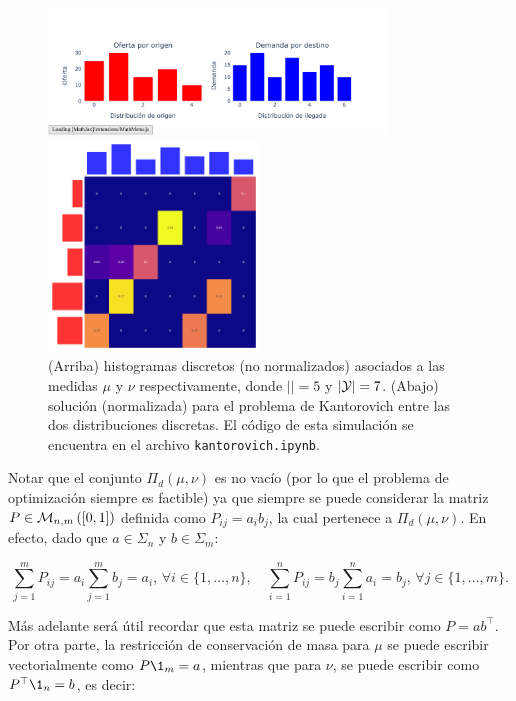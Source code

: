 \begin{figure}
	\centering
	\includegraphics[width=0.8\textwidth]{images/ot/kantorovich_discrete_histogram}

	\includegraphics[width=0.5\textwidth]{images/ot/kantorovich_discrete_solution}
	\caption{(Arriba) histogramas discretos (no normalizados) asociados a las medidas $\mu$ y $\nu$ respectivamente, donde $|\xspace|=5$ y $|\mathcal{Y}|=7$. (Abajo) solución (normalizada) para el problema de Kantorovich entre las dos distribuciones discretas. El código de esta simulación se encuentra en el archivo \texttt{kantorovich.ipynb}.}
	\label{fig:ot/kantorovich_discrete_example}
\end{figure}

Notar que el conjunto $\Pi_d(\mu,\nu)$ es no vacío (por lo que el problema de optimización siempre es factible) ya que siempre se puede considerar la matriz $P\in\mathcal{M}_{n,m}\left([0,1]\right)$ definida como $P_{ij}=a_ib_j$, la cual pertenece a $\Pi_d(\mu,\nu)$. En efecto, dado que $a\in\Sigma_n$ y $b\in\Sigma_m$:

\begin{equation*}
	\sum_{j=1}^m P_{ij} = a_i\sum_{j=1}^m b_j = a_i,\, \forall i\in\{1,\ldots,n\},
	\quad
	\sum_{i=1}^n P_{ij} = b_j\sum_{i=1}^n a_i = b_j,\, \forall j\in\{1,\ldots,m\}.
\end{equation*}

Más adelante será útil recordar que esta matriz se puede escribir como $P=ab^\top$. Por otra parte, la restricción de conservación de masa para $\mu$ se puede escribir vectorialmente como $P\1_{m}=a$, mientras que para $\nu$, se puede escribir como $P^\top \1_n = b$, es decir:

